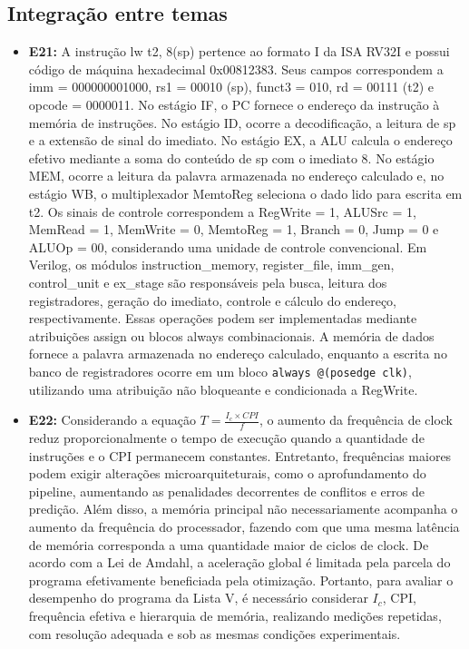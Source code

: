 \documentclass[12pt,a4paper,titlepage]{article}
\begin{document}
\subsection{Integração entre temas}
\begin{itemize}
    \item\textbf{E21:}
        A instrução lw t2, 8(sp) pertence ao formato I da ISA RV32I e possui código de máquina hexadecimal 0x00812383.
        Seus campos correspondem a imm = 000000001000, rs1 = 00010 (sp), funct3 = 010, rd = 00111 (t2) e opcode = 0000011.
        No estágio IF, o PC fornece o endereço da instrução à memória de instruções. No estágio ID, ocorre a decodificação,
        a leitura de sp e a extensão de sinal do imediato. No estágio EX, a ALU calcula o endereço efetivo mediante a soma
        do conteúdo de sp com o imediato 8. No estágio MEM, ocorre a leitura da palavra armazenada no endereço calculado e,
        no estágio WB, o multiplexador MemtoReg seleciona o dado lido para escrita em t2.
        Os sinais de controle correspondem a RegWrite = 1, ALUSrc = 1, MemRead = 1, MemWrite = 0, MemtoReg = 1, Branch = 0,
        Jump = 0 e ALUOp = 00, considerando uma unidade de controle convencional.
        Em Verilog, os módulos instruction\_memory, register\_file, imm\_gen, control\_unit e ex\_stage são responsáveis
        pela busca, leitura dos registradores, geração do imediato, controle e cálculo do endereço, respectivamente.
        Essas operações podem ser implementadas mediante atribuições assign ou blocos always combinacionais.
        A memória de dados fornece a palavra armazenada no endereço calculado, enquanto a escrita no banco de registradores
        ocorre em um bloco \texttt{always @(posedge clk)}, utilizando uma atribuição não bloqueante e condicionada a RegWrite.

    \item\textbf{E22:}
        Considerando a equação $T = \frac{I_c \times CPI}{f}$, o aumento da frequência de clock reduz proporcionalmente
        o tempo de execução quando a quantidade de instruções e o CPI permanecem constantes.
        Entretanto, frequências maiores podem exigir alterações microarquiteturais, como o aprofundamento do pipeline,
        aumentando as penalidades decorrentes de conflitos e erros de predição.
        Além disso, a memória principal não necessariamente acompanha o aumento da frequência do processador, fazendo com
        que uma mesma latência de memória corresponda a uma quantidade maior de ciclos de clock.
        De acordo com a Lei de Amdahl, a aceleração global é limitada pela parcela do programa efetivamente beneficiada
        pela otimização.
        Portanto, para avaliar o desempenho do programa da Lista V, é necessário considerar $I_c$, CPI, frequência efetiva
        e hierarquia de memória, realizando medições repetidas, com resolução adequada e sob as mesmas condições experimentais.


\end{itemize}
\end{document}
